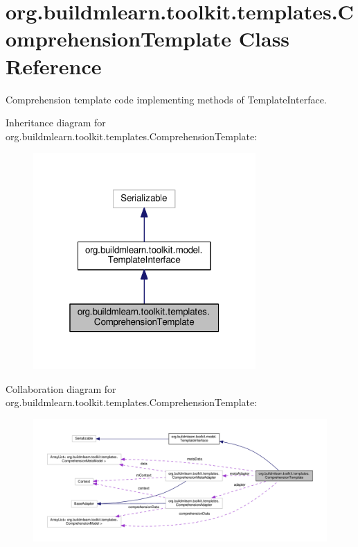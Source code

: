 \hypertarget{classorg_1_1buildmlearn_1_1toolkit_1_1templates_1_1ComprehensionTemplate}{}\section{org.\+buildmlearn.\+toolkit.\+templates.\+Comprehension\+Template Class Reference}
\label{classorg_1_1buildmlearn_1_1toolkit_1_1templates_1_1ComprehensionTemplate}


Comprehension template code implementing methods of Template\+Interface.  




Inheritance diagram for org.\+buildmlearn.\+toolkit.\+templates.\+Comprehension\+Template\+:
\nopagebreak
\begin{figure}[H]
\begin{center}
\leavevmode
\includegraphics[width=241pt]{classorg_1_1buildmlearn_1_1toolkit_1_1templates_1_1ComprehensionTemplate__inherit__graph}
\end{center}
\end{figure}


Collaboration diagram for org.\+buildmlearn.\+toolkit.\+templates.\+Comprehension\+Template\+:
\nopagebreak
\begin{figure}[H]
\begin{center}
\leavevmode
\includegraphics[width=350pt]{classorg_1_1buildmlearn_1_1toolkit_1_1templates_1_1ComprehensionTemplate__coll__graph}
\end{center}
\end{figure}

